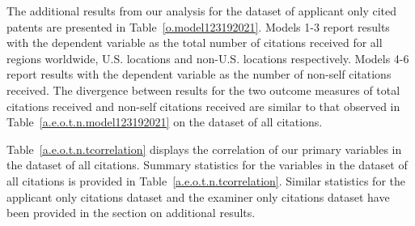 \documentclass[12pt,letterpaper]{article}
\begin{document}
The additional results from our analysis for the dataset of applicant only cited patents are presented in Table~\ref{o.model123192021}. Models 1-3 report results with the dependent variable as the total number of citations received for all regions worldwide, U.S. locations and non-U.S. locations respectively. Models 4-6 report results with the dependent variable as the number of non-self citations received. The divergence between results for the two outcome measures of total citations received and non-self citations received are similar to that observed in Table~\ref{a.e.o.t.n.model123192021} on the dataset of all citations. \par



Table~\ref{a.e.o.t.n.tcorrelation} displays the correlation of our primary variables in the dataset of  all citations. Summary statistics for the variables in the dataset of all citations is provided in Table~\ref{a.e.o.t.n.tcorrelation}. Similar statistics for the applicant only citations dataset and the examiner only citations dataset have been provided in the section on additional results.


%


%
%




\renewcommand{\thefigure}{\arabic{figure}}
\renewcommand{\thetable}{\arabic{table}}
\end{document}

